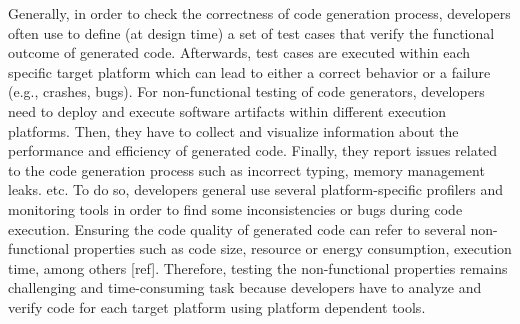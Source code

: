 Generally, in order to check the correctness of code generation process, developers often use to define (at design time) a set of test cases that verify the functional outcome of generated code. Afterwards, test cases are executed within each specific target platform which can lead to either a correct behavior or a failure (e.g., crashes, bugs). 
For non-functional testing of code generators, developers need to deploy and execute software artifacts within different execution platforms. Then, they have to collect and visualize information about the performance and efficiency of generated code. Finally, they report issues related to the code generation process such as incorrect typing, memory management leaks. etc. To do so, developers general use several platform-specific profilers and monitoring tools in order to find some inconsistencies or bugs during code execution. Ensuring the code quality of generated code can refer to several non-functional properties such as code size, resource or energy consumption, execution time, among others [ref]. Therefore, testing the non-functional properties remains challenging and time-consuming task because developers have to analyze and verify code for each target platform using platform dependent tools.
















